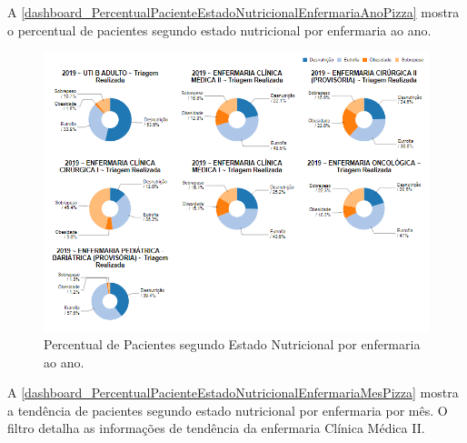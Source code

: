 \newpage
A \autoref{dashboard_PercentualPacienteEstadoNutricionalEnfermariaAnoPizza} mostra o percentual de pacientes segundo estado nutricional por enfermaria ao ano.

\begin{figure}[htb]
	\caption{\label{dashboard_PercentualPacienteEstadoNutricionalEnfermariaAnoPizza}Percentual de Pacientes segundo Estado Nutricional por enfermaria ao ano.}
	\begin{center}
	    \includegraphics[scale=0.6]{Imagens/3.3.PercentualPacienteEstadoNutricionalEnfermariaAnoPizza.png}
	\end{center}
\end{figure}

\newpage
A \autoref{dashboard_PercentualPacienteEstadoNutricionalEnfermariaMesPizza} mostra a tendência de pacientes segundo estado nutricional por enfermaria por mês. O filtro detalha as informações de tendência da enfermaria Clínica Médica II.

